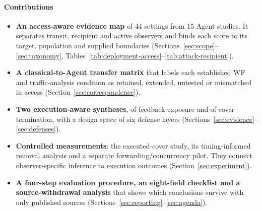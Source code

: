 \paragraph{Contributions}
\begin{itemize}
\item \textbf{An access-aware evidence map} of 44 settings from 15 Agent studies. It separates transit, recipient and active observers and binds each score to its target, population and supplied boundaries (Sections~\ref{sec:scope}--\ref{sec:taxonomy}, Tables~\ref{tab:deployment-access}--\ref{tab:attack-recipient}).
\item \textbf{A classical-to-Agent transfer matrix} that labels each established WF and traffic-analysis condition as retained, extended, untested or mismatched in access (Section~\ref{sec:correspondence}).
\item \textbf{Two execution-aware syntheses}, of feedback exposure and of cover termination, with a design space of six defense layers (Sections~\ref{sec:evidence}--\ref{sec:defenses}).
\item \textbf{Controlled measurements}: the executed-cover study, its timing-informed removal analysis and a separate forwarding/concurrency pilot. They connect observer-specific inference to execution outcomes (Section~\ref{sec:experiment}).
\item \textbf{A four-step evaluation procedure, an eight-field checklist and a source-withdrawal analysis} that shows which conclusions survive with only published sources (Sections~\ref{sec:reporting}--\ref{sec:agenda}).
\end{itemize}
